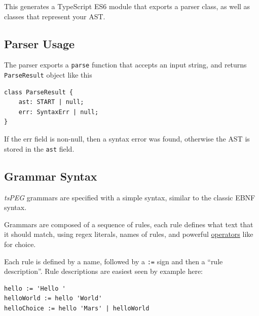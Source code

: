 This generates a TypeScript ES6 module that exports a parser class, as
well as classes that represent your AST.

\subsection{Parser Usage}\label{parser-usage}

The parser exports a \texttt{parse} function that accepts an input
string, and returns \texttt{ParseResult} object like this

\begin{verbatim}
class ParseResult {
    ast: START | null;
    err: SyntaxErr | null;
}
\end{verbatim}

If the err field is non-null, then a syntax error was found, otherwise
the AST is stored in the \texttt{ast} field.

\subsection{Grammar Syntax}\label{grammar-syntax}

\emph{tsPEG} grammars are specified with a simple syntax, similar to the
classic EBNF syntax.

Grammars are composed of a sequence of rules, each rule defines what
text that it should match, using regex literals, names of rules, and
powerful \protect\hyperlink{operators}{operators} like
\texttt{\textbar{}} for choice.

Each rule is defined by a name, followed by a \texttt{:=} sign and then
a ``rule description''. Rule descriptions are easiest seen by example
here:

\begin{verbatim}
hello := 'Hello '
helloWorld := hello 'World'
helloChoice := hello 'Mars' | helloWorld
\end{verbatim}

